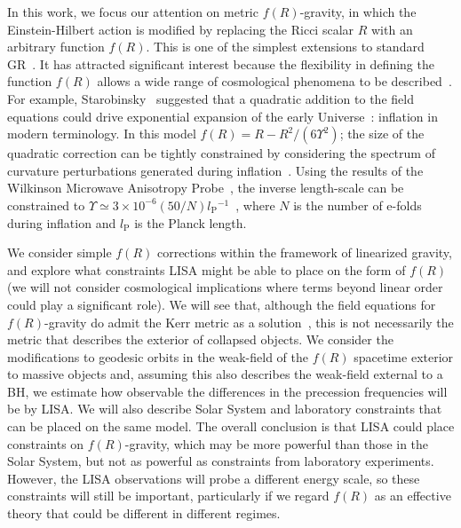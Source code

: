 \documentclass[aps,prd,amsfonts,amssymb,amsmath,nofootinbib,reprint,showpacs]{revtex4-1}
\newcommand{\sub}[1]{\ensuremath{_\text{#1}}}
\begin{document}
In this work, we focus our attention on metric $f(R)$-gravity, in which the Einstein-Hilbert action is modified by replacing the Ricci scalar $R$ with an arbitrary function $f(R)$. This is one of the simplest extensions to standard GR~\cite{Sotiriou2010, DeFelice2010}. It has attracted significant interest because the flexibility in defining the function $f(R)$ allows a wide range of cosmological phenomena to be described~\cite{Nojiri2007, Capozziello2007a}. For example, Starobinsky~\cite{Starobinsky1980} suggested that a quadratic addition to the field equations could drive exponential expansion of the early Universe~\cite{Vilenkin1985}: inflation in modern terminology. In this model $f(R) = R - R^2/(6\Upsilon^2)$; the size of the quadratic correction can be tightly constrained by considering the spectrum of curvature perturbations generated during inflation~\cite{Starobinskii1983, Starobinskii1985}. Using the results of the Wilkinson Microwave Anisotropy Probe~\cite{Jarosik2011, Larson2011}, the inverse length-scale can be constrained to $\Upsilon \simeq 3 \times 10^{-6} (50/N) l\sub{P}^{-1}$~\cite{Starobinsky2007, DeFelice2010}, where $N$ is the number of e-folds during inflation and $l\sub{P}$ is the Planck length. 

We consider simple $f(R)$ corrections within the framework of linearized gravity, and explore what constraints LISA might be able to place on the form of $f(R)$ (we will not consider cosmological implications where terms beyond linear order could play a significant role). We will see that, although the field equations for $f(R)$-gravity do admit the Kerr metric as a solution~\cite{Psaltis2008, Barausse2008}, this is not necessarily the metric that describes the exterior of collapsed objects. We consider the modifications to geodesic orbits in the weak-field of the $f(R)$ spacetime exterior to massive objects and, assuming this also describes the weak-field external to a BH, we estimate how observable the differences in the precession frequencies will be by LISA. We will also describe Solar System and laboratory constraints that can be placed on the same model. The overall conclusion is that LISA could place constraints on $f(R)$-gravity, which may be more powerful than those in the Solar System, but not as powerful as constraints from laboratory experiments. However, the LISA observations will probe a different energy scale, so these constraints will still be important, particularly if we regard $f(R)$ as an effective theory that could be different in different regimes. 
\end{document}
